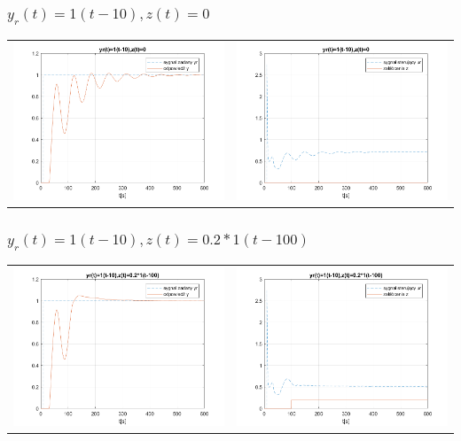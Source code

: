 \documentclass[a4paper]{article}
\begin{document}
\subsubsection{$y_r(t)=1(t-10), z(t)=0$}
\begin{tabular}{cc}
	\includegraphics[width=7cm]{pkt5_1a} &	\includegraphics[width=7cm]{pkt5_1b}
\end{tabular}
\subsubsection{$y_r(t)=1(t-10), z(t)=0.2*1(t-100)$}
\begin{tabular}{cc}
	\includegraphics[width=7cm]{pkt5_2a} &	\includegraphics[width=7cm]{pkt5_2b}
\end{tabular}
\end{document}
